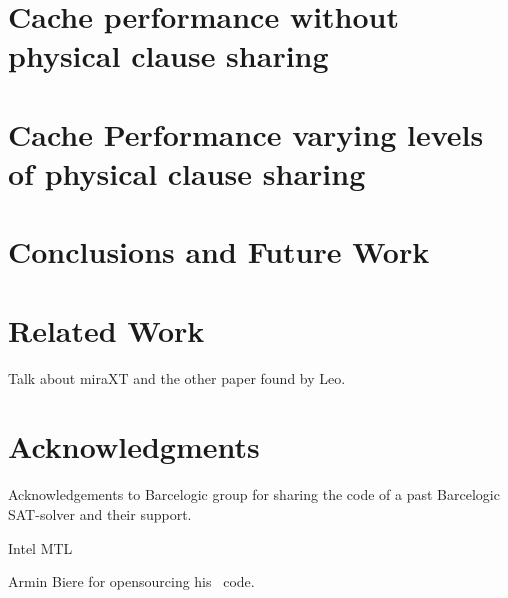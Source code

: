 \documentclass{article}
\begin{document}
\section{Cache performance without physical clause sharing}



\section{Cache Performance varying levels of physical clause sharing}





\section{Conclusions and Future Work}



\section{Related Work}



Talk about miraXT and the other paper found by Leo.


\section*{Acknowledgments}

Acknowledgements to Barcelogic group for sharing the code of a past
Barcelogic SAT-solver and their support.

Intel MTL

Armin Biere for opensourcing his \pling\ code.




\end{document}
